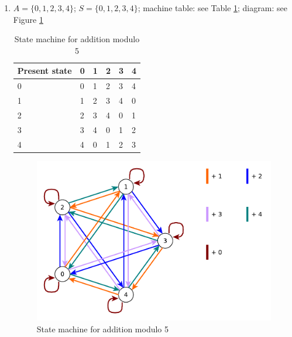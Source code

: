 \begin{enumerate}
    \item $A = \{0, 1, 2, 3, 4\}$; $S = \{0, 1, 2, 3, 4\}$; machine table: see Table \ref{tab:add-modulo-5}; diagram: see Figure \ref{fig:add-modulo-5}
    \begin{table}[]
        \centering
        \begin{tabular}{l|lllll}
        Present state & 0 & 1 & 2 & 3 & 4 \\ \hline
        0             & 0 & 1 & 2 & 3 & 4 \\
        1             & 1 & 2 & 3 & 4 & 0 \\
        2             & 2 & 3 & 4 & 0 & 1 \\
        3             & 3 & 4 & 0 & 1 & 2 \\
        4             & 4 & 0 & 1 & 2 & 3
        \end{tabular}
        \caption{State machine for addition modulo 5}
        \label{tab:add-modulo-5}
    \end{table}
    \begin{figure}[!ht]
        \centering
        \includegraphics[scale=0.5]{diagrams/add-modulo-5.pdf}
        \caption{State machine for addition modulo 5}
        \label{fig:add-modulo-5}
    \end{figure}


\end{enumerate}
